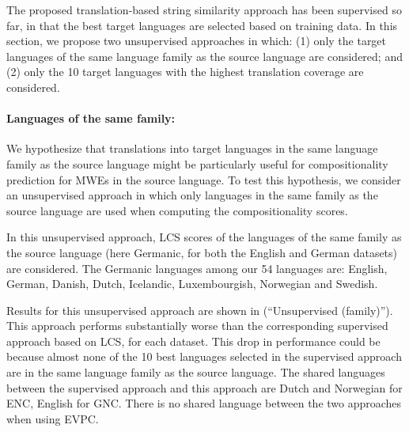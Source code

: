 \documentclass[output=paper
,modfonts
,nonflat]{langsci/langscibook}
\begin{document}
The proposed translation-based string similarity approach has been
supervised so far, in that the best target languages are selected
based on training data. In this section, we propose two unsupervised
approaches in which: (1) only the target languages of the same language
family as the source language are considered; and (2) only the 10
target languages with the highest translation coverage are considered.

\paragraph*{Languages of the same family:}


We hypothesize that translations into target languages in the same
language family as the source language might be particularly useful
for compositionality prediction for MWEs in the source language. To
test this hypothesis, we consider an unsupervised approach in which
only languages in the same family as the source language are used when
computing the compositionality scores.

In this unsupervised approach, LCS scores of the languages of the same
family as the source language (here Germanic, for both the English and
German datasets) are considered. The Germanic languages among our 54
languages are: English, German, Danish, Dutch, Icelandic,
Luxembourgish, Norwegian and Swedish.

Results for this unsupervised approach are shown in
 (``Unsupervised (family)''). This
approach performs substantially worse than the corresponding
supervised approach based on LCS, for each dataset. This drop in
performance could be because almost none of the 10 best languages
selected in the supervised approach are in the same language family as
the source language. The shared languages between the supervised approach
and this approach are Dutch and Norwegian for ENC, English for GNC. 
There is no shared language between the two approaches when using EVPC.


\end{document}
